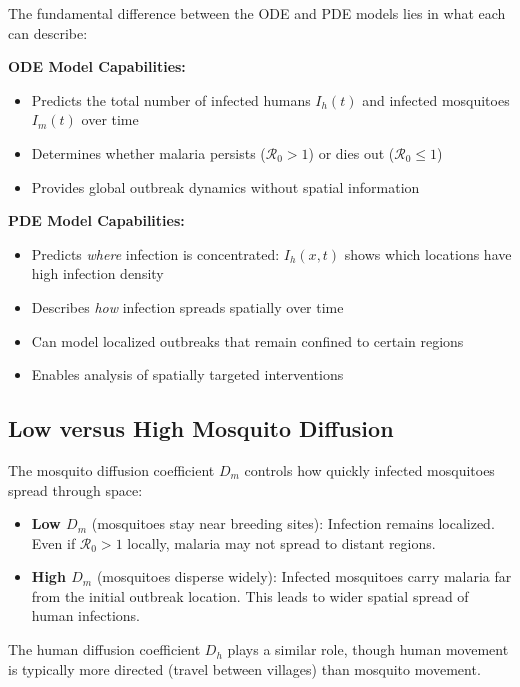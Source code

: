 \documentclass[12pt]{article}
\begin{document}
The fundamental difference between the ODE and PDE models lies in what each can describe:

\textbf{ODE Model Capabilities:}
\begin{itemize}
    \item Predicts the total number of infected humans $I_h(t)$ and infected mosquitoes $I_m(t)$ over time
    \item Determines whether malaria persists ($\mathcal{R}_0 > 1$) or dies out ($\mathcal{R}_0 \leq 1$)  
    \item Provides global outbreak dynamics without spatial information
\end{itemize}

\textbf{PDE Model Capabilities:}
\begin{itemize}
    \item Predicts \emph{where} infection is concentrated: $I_h(x,t)$ shows which locations have high infection density
    \item Describes \emph{how} infection spreads spatially over time
    \item Can model localized outbreaks that remain confined to certain regions
    \item Enables analysis of spatially targeted interventions
\end{itemize}

\subsection{Low versus High Mosquito Diffusion}

The mosquito diffusion coefficient $D_m$ controls how quickly infected mosquitoes spread through space:

\begin{itemize}
    \item \textbf{Low $D_m$} (mosquitoes stay near breeding sites): Infection remains localized. Even if $\mathcal{R}_0 > 1$ locally, malaria may not spread to distant regions. 
    
    \item \textbf{High $D_m$} (mosquitoes disperse widely): Infected mosquitoes carry malaria far from the initial outbreak location. This leads to wider spatial spread of human infections. 
\end{itemize}

The human diffusion coefficient $D_h$ plays a similar role, though human movement is typically more directed (travel between villages) than mosquito movement.
\end{document}
